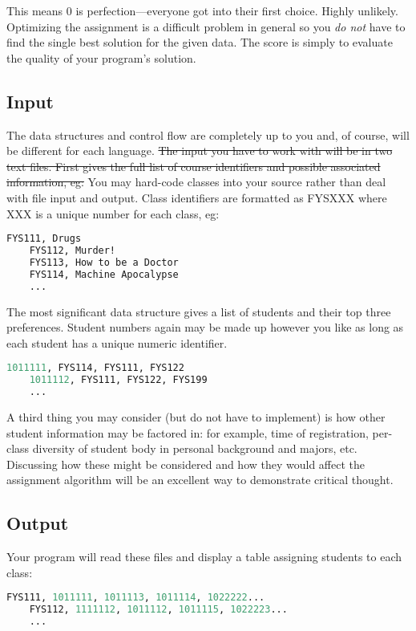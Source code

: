 \documentclass[12pt,info]{asg}
\begin{document}
This means 0 is perfection---everyone got into their first choice. Highly unlikely. Optimizing the assignment is a difficult problem in general so you {\em do not} have to find the single best solution for the given data. The score is simply to evaluate the quality of your program's solution.

\subsection*{Input}

The data structures and control flow are completely up to you and, of course, will be different for each language.
\sout{The input you have to work with will be in two text files. First gives the full list of course identifiers and possible associated information, eg:}
You may hard-code classes into your source rather than deal with file input and output. Class identifiers are formatted as FYSXXX where XXX is a unique number for each class, eg:
\begin{lstlisting}[language=Lisp]
	FYS111, Drugs
	FYS112, Murder!
	FYS113, How to be a Doctor
	FYS114, Machine Apocalypse
	...
\end{lstlisting}

The most significant data structure gives a list of students and their top three preferences. Student numbers again may be made up however you like as long as each student has a unique numeric identifier.
\begin{lstlisting}[language=Lisp]
	1011111, FYS114, FYS111, FYS122
	1011112, FYS111, FYS122, FYS199
	...
\end{lstlisting}

A third thing you may consider (but do not have to implement) is how other student information may be factored in: for example, time of registration, per-class diversity of student body in personal background and majors, etc. Discussing how these might be considered and how they would affect the assignment algorithm will be an excellent way to demonstrate critical thought.

\subsection*{Output}
Your program will read these files and display a table assigning students to each class:
\begin{lstlisting}[language=Lisp]
	FYS111, 1011111, 1011113, 1011114, 1022222...
	FYS112, 1111112, 1011112, 1011115, 1022223...
	...
\end{lstlisting}
\end{document}
